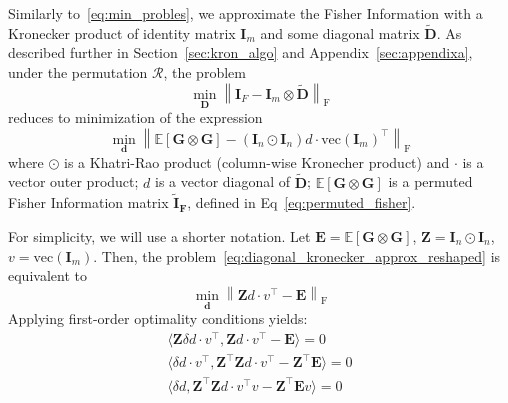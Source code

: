 \documentclass{article}
\begin{document}

Similarly to~\ref{eq:min_probles}, we approximate the Fisher Information with a Kronecker product of identity matrix $\mathbf{I}_m$ and some diagonal matrix $\mathbf{\tilde{D}}$.
As described further in Section~\ref{sec:kron_algo} and Appendix~\ref{sec:appendixa}, under the permutation $\mathcal{R}$, the problem 
\begin{equation}\label{eq:diagonal_kronecker_approx}
    \underset{\mathbf{D}}{\min}  \left\| \mathbf{I}_F - \mathbf{I}_m \otimes \mathbf{\tilde{D}} \right\|_{\operatorname{F}}
\end{equation}
reduces to minimization of the expression
\begin{equation}\label{eq:diagonal_kronecker_approx_reshaped}
    \underset{\mathbf{d}}{\min} \left\| \mathbb{E} [\mathbf{G} \otimes \mathbf{G}]  - (\mathbf{I}_n \odot \mathbf{I}_n) d \cdot  \mathrm{vec} (\mathbf{I}_m)^\top \right\|_{\operatorname{F}}
\end{equation}
where $\odot$ is a Khatri-Rao product (column-wise Kronecher product) and $\cdot$ is a vector outer product; $d$ is a vector diagonal of $\mathbf{\tilde{D}}$; $\mathbb{E} [\mathbf{G} \otimes \mathbf{G}]$ is a permuted Fisher Information matrix  $\mathbf{\tilde{I}_F}$, defined in Eq~\ref{eq:permuted_fisher}. 

For simplicity, we will use a shorter notation. Let $ \mathbf{E} = \mathbb{E} [\mathbf{G} \otimes \mathbf{G}] $, $ \mathbf{Z} = \mathbf{I}_n \odot \mathbf{I}_n$, $v =  \mathrm{vec} (\mathbf{I}_m)$. Then, the problem~\ref{eq:diagonal_kronecker_approx_reshaped} is equivalent to
\begin{equation}
    \underset{\mathbf{d}}{\min} \left\|  \mathbf{Z} d \cdot v^\top  - \mathbf{E} \right\|_{\operatorname{F}}
\end{equation}
Applying first-order optimality conditions yields:
\begin{gather*}
    \langle \mathbf{Z} \delta d \cdot v^\top, \mathbf{Z} d \cdot v^\top  - \mathbf{E} \rangle = 0 \\
    \langle \delta d \cdot v^\top, \mathbf{Z}^\top \mathbf{Z} d \cdot v^\top  - \mathbf{Z}^\top\mathbf{E} \rangle = 0 \\
    \langle \delta d , \mathbf{Z}^\top \mathbf{Z} d \cdot v^\top v  - \mathbf{Z}^\top\mathbf{E}v \rangle = 0 \\
\end{gather*}
\end{document}
